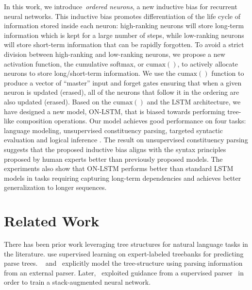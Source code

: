 \documentclass{article} \usepackage{iclr2019_conference,times}
\newcommand{\cumax}{\mathrm{cumax}}
\begin{document}
In this work, we introduce~\emph{ordered neurons}, a new inductive bias for recurrent neural networks.
This inductive bias promotes differentiation of the life cycle of information stored inside each neuron: high-ranking neurons will store long-term information which is kept for a large number of steps, while low-ranking neurons will store short-term information that can be rapidly forgotten.
To avoid a strict division between high-ranking and low-ranking neurons, we propose a new activation function, the cumulative softmax, or $\cumax()$, to actively allocate neurons to store long/short-term information. 
We use the $\cumax()$ function to produce a vector of “master” input and forget gates ensuring  that when a given neuron is updated (erased), all of the neurons that follow it in the ordering are also updated (erased).
Based on the $\cumax()$ and the LSTM architecture, we have designed a new model, ON-LSTM, that is biased towards performing tree-like composition operations. Our model achieves good performance on four tasks: language modeling, unsupervised constituency parsing, targeted syntactic evaluation \citep{marvin2018targeted} and logical inference \citep{bowman2015tree}.
The result on unsupervised constituency parsing suggests that the proposed inductive bias aligns with the syntax principles proposed by human experts better than previously proposed models.
The experiments also show that ON-LSTM performs better than standard LSTM models in tasks requiring capturing long-term dependencies and achieves better generalization to longer sequences.





%
 
\section{Related Work}


There has been prior work leveraging tree structures for natural language tasks in the literature.
\cite{socher2010learning, alvarez2016tree, zhou2017generative, zhang2015top} use supervised learning on expert-labeled treebanks for predicting parse trees.
~\cite{socher2013recursive} and~\cite{tai2015improved} explicitly model the tree-structure using parsing information from an external parser.
Later,~\cite{bowman2016fast} exploited guidance from a supervised parser~\citep{klein2003accurate} in order to train a stack-augmented neural network.
\end{document}
